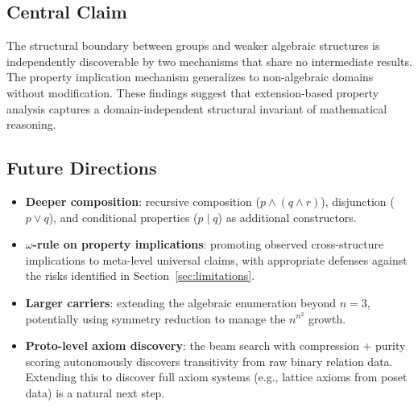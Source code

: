\subsection{Central Claim}

The structural boundary between groups and weaker algebraic structures is independently discoverable by two mechanisms that share no intermediate results. The property implication mechanism generalizes to non-algebraic domains without modification. These findings suggest that extension-based property analysis captures a domain-independent structural invariant of mathematical reasoning.

\subsection{Future Directions}

\begin{itemize}
\item \textbf{Deeper composition}: recursive composition ($p \wedge (q \wedge r)$), disjunction ($p \vee q$), and conditional properties ($p \mid q$) as additional constructors.

\item \textbf{$\omega$-rule on property implications}: promoting observed cross-structure implications to meta-level universal claims, with appropriate defenses against the risks identified in Section~\ref{sec:limitations}.

\item \textbf{Larger carriers}: extending the algebraic enumeration beyond $n = 3$, potentially using symmetry reduction to manage the $n^{n^2}$ growth.

\item \textbf{Proto-level axiom discovery}: the beam search with compression + purity scoring autonomously discovers transitivity from raw binary relation data. Extending this to discover full axiom systems (e.g., lattice axioms from poset data) is a natural next step.
\end{itemize}
